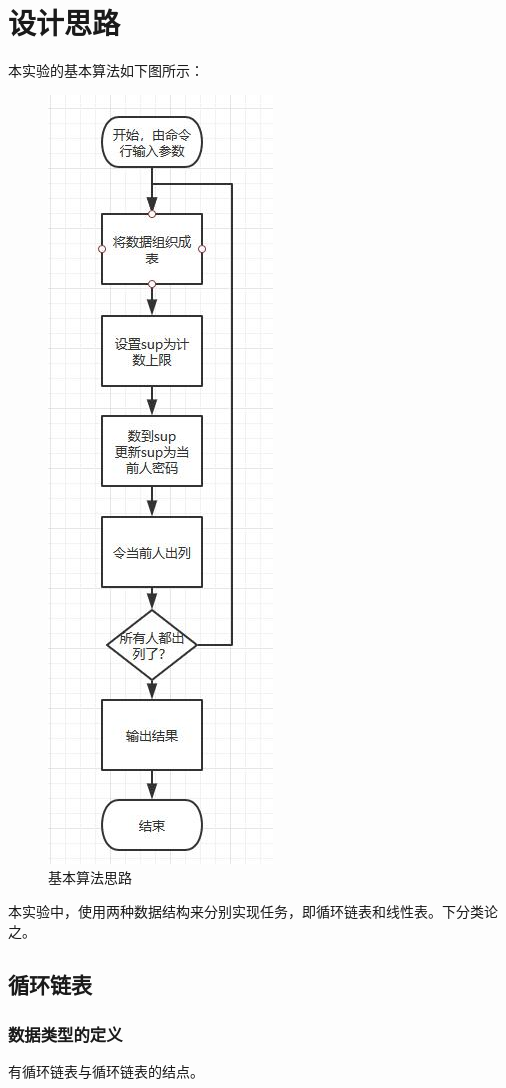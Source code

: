 \documentclass[UTF8]{article}
\begin{document}
	\section{设计思路}
	本实验的基本算法如下图所示：
	\begin{figure}[H]
		\centering
		\includegraphics[scale=0.7]{process.jpg}
		\caption{基本算法思路}
		\label{process}
	\end{figure}\par
	本实验中，使用两种数据结构来分别实现任务，即循环链表和线性表。下分类论之。
	\subsection{循环链表}
	\subsubsection{数据类型的定义}
	有循环链表与循环链表的结点。
\end{document}
